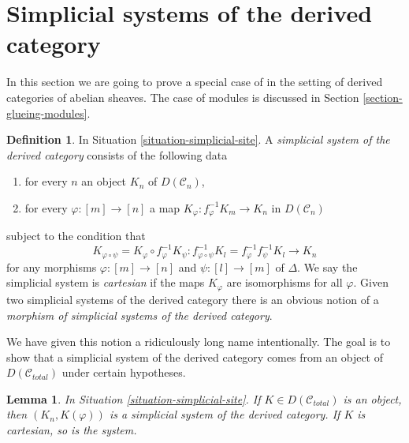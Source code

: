 \documentclass{stacks-project}
\theoremstyle{plain}
\newtheorem{lemma}[subsection]{Lemma}
\theoremstyle{definition}
\newtheorem{definition}[subsection]{Definition}
\theoremstyle{remark}
\numberwithin{equation}{subsection}
\begin{document}
\section{Simplicial systems of the derived category}
\label{section-glueing}

\noindent
In this section we are going to prove a special case of
\cite[Proposition 3.2.9]{BBD} in the setting of derived
categories of abelian sheaves. The case of modules
is discussed in Section \ref{section-glueing-modules}.

\begin{definition}
\label{definition-cartesian-derived}
In Situation \ref{situation-simplicial-site}. A
{\it simplicial system of the derived category}
consists of the following data
\begin{enumerate}
\item for every $n$ an object $K_n$ of $D(\mathcal{C}_n)$,
\item for every $\varphi : [m] \to [n]$ a map
$K_\varphi : f_\varphi^{-1}K_m \to K_n$ in $D(\mathcal{C}_n)$
\end{enumerate}
subject to the condition that
$$
K_{\varphi \circ \psi} = K_\varphi \circ f_\varphi^{-1}K_\psi :
f_{\varphi \circ \psi}^{-1}K_l = f_\varphi^{-1} f_\psi^{-1}K_l
\longrightarrow
K_n
$$
for any morphisms $\varphi : [m] \to [n]$ and $\psi : [l] \to [m]$ of $\Delta$.
We say the simplicial system is {\it cartesian} if the maps $K_\varphi$
are isomorphisms for all $\varphi$.
Given two simplicial systems of the derived category
there is an obvious notion of a
{\it morphism of simplicial systems of the derived category}.
\end{definition}

\noindent
We have given this notion a ridiculously long name intentionally.
The goal is to show that a simplicial system of the derived category
comes from an object of $D(\mathcal{C}_{total})$ under certain
hypotheses.

\begin{lemma}
\label{lemma-cartesian-objects-derived}
In Situation \ref{situation-simplicial-site}.
If $K \in D(\mathcal{C}_{total})$ is an object,
then $(K_n, K(\varphi))$ is a simplicial system of the derived category.
If $K$ is cartesian, so is the system.
\end{lemma}
\end{document}
